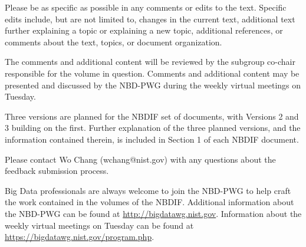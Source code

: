 Please be as specific as possible in any comments or edits to the text. Specific edits include, but are not limited to, changes in the current text, additional text further explaining a topic or explaining a new topic, additional references, or comments about the text, topics, or document organization. 

The comments and additional content will be reviewed by the subgroup co-chair responsible for the volume in question. Comments and additional content may be presented and discussed by the NBD-PWG during the weekly virtual meetings on Tuesday. 

Three versions are planned for the NBDIF set of documents, with Versions 2 and 3 building on the first. Further explanation of the three planned versions, and the information contained therein, is included in Section 1 of each NBDIF document.

Please contact Wo Chang (wchang@nist.gov) with any questions about the feedback submission process. 

Big Data professionals are always welcome to join the NBD-PWG to help craft the work contained in the volumes of the NBDIF. Additional information about the NBD-PWG can be found at \url{http://bigdatawg.nist.gov}. Information about the weekly virtual meetings on Tuesday can be found at \url{https://bigdatawg.nist.gov/program.php}. 

